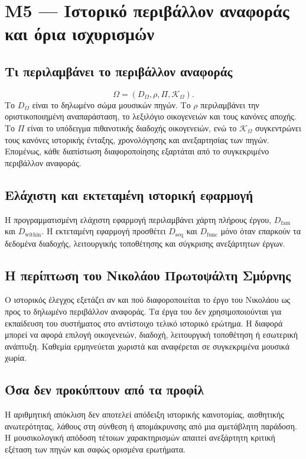 \documentclass[11pt,a4paper]{extarticle}
\begin{document}
\section{M5 — Ιστορικό περιβάλλον αναφοράς και όρια ισχυρισμών}
\subsection*{Τι περιλαμβάνει το περιβάλλον αναφοράς}
\[
\Omega=(D_\Omega,\rho,\Pi,\mathcal K_\Omega).
\]
Το \(D_\Omega\) είναι το δηλωμένο σώμα μουσικών πηγών. Το \(\rho\) περιλαμβάνει την οριστικοποιημένη αναπαράσταση, το λεξιλόγιο οικογενειών και τους κανόνες αποχής. Το \(\Pi\) είναι το υπόδειγμα πιθανοτικής διαδοχής οικογενειών, ενώ το \(\mathcal K_\Omega\) συγκεντρώνει τους κανόνες ιστορικής ένταξης, χρονολόγησης και ανεξαρτησίας των πηγών. Επομένως, κάθε διαπίστωση διαφοροποίησης εξαρτάται από το συγκεκριμένο περιβάλλον αναφοράς.

\subsection*{Ελάχιστη και εκτεταμένη ιστορική εφαρμογή}
Η προγραμματισμένη ελάχιστη εφαρμογή περιλαμβάνει χάρτη πλήρους έργου, \(D_{\mathrm{fam}}\) και \(D_{\mathrm{within}}\). Η εκτεταμένη εφαρμογή προσθέτει \(D_{\mathrm{seq}}\) και \(D_{\mathrm{func}}\) μόνο όταν επαρκούν τα δεδομένα διαδοχής, λειτουργικής τοποθέτησης και σύγκρισης ανεξάρτητων έργων.

\subsection*{Η περίπτωση του Νικολάου Πρωτοψάλτη Σμύρνης}
Ο ιστορικός έλεγχος εξετάζει αν και πού διαφοροποιείται το έργο του Νικολάου ως προς το δηλωμένο περιβάλλον αναφοράς. Τα έργα του δεν χρησιμοποιούνται για εκπαίδευση του συστήματος στο αντίστοιχο τελικό ιστορικό ερώτημα. Η διαφορά μπορεί να αφορά επιλογή οικογενειών, διαδοχή, λειτουργική τοποθέτηση ή εσωτερική ανάπτυξη. Καθεμία ερμηνεύεται χωριστά και αναφέρεται σε συγκεκριμένα μουσικά χωρία.

\subsection*{Όσα δεν προκύπτουν από τα προφίλ}
Η αριθμητική απόκλιση δεν αποτελεί απόδειξη ιστορικής καινοτομίας, αισθητικής ανωτερότητας, λάθους στη σύνθεση ή απομάκρυνσης από μια αμετάβλητη παράδοση. Η μουσικολογική απόδοση τέτοιων χαρακτηρισμών απαιτεί ανεξάρτητη κριτική εξέταση των πηγών και σαφώς ορισμένα ερωτήματα.
\end{document}
